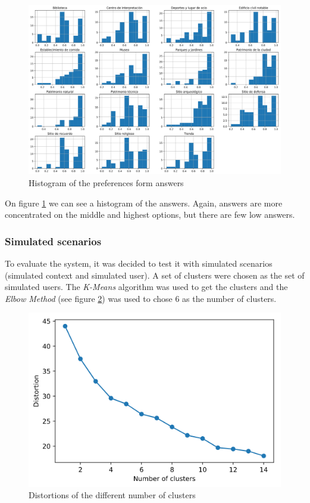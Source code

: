 \begin{figure}[h]
    \centering
    \includegraphics[scale=0.25]{histograma.png}
    \caption{Histogram of the preferences form answers}
    \label{fig:histograma}
\end{figure}

On figure \ref{fig:histograma} we can see a histogram of the answers. Again, answers are more concentrated on the middle and highest options, but there are few low answers.

\subsubsection{Simulated scenarios}
To evaluate the system, it was decided to test it with simulated scenarios (simulated context and simulated user). A set of clusters were chosen as the set of simulated users. The \textit{K-Means} algorithm was used to get the clusters and the \textit{Elbow Method} (see figure \ref{fig:elbow}) was used to chose $6$ as the number of clusters.


\begin{figure}[h]
    \centering
    \includegraphics[scale=0.45]{elbow.png}
    \caption{Distortions of the different number of clusters}
    \label{fig:elbow}
\end{figure}
